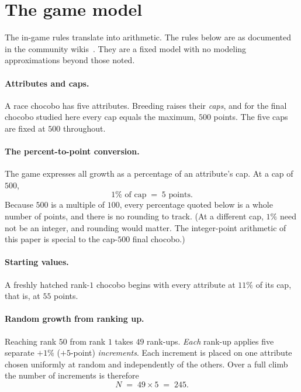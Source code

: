 \documentclass[11pt]{article}
\theoremstyle{remark}
\begin{document}
\section{The game model}\label{sec:model}

The in-game rules translate into arithmetic. The rules below are as documented
in the community wikis~\cite{cgw,wp-rankup,wp-final,wp-train,icy}. They are a fixed model with no
modeling approximations beyond those noted.

\paragraph{Attributes and caps.}
A race chocobo has five attributes. Breeding raises their \emph{caps}, and for the
final chocobo studied here every cap equals the maximum, $500$ points. The five caps
are fixed at $500$ throughout.

\paragraph{The percent-to-point conversion.}
The game expresses all growth as a percentage of an attribute's cap. At a cap of
$500$,
\[
   1\%\text{ of cap} \;=\; 5\text{ points.}
\]
Because $500$ is a multiple of $100$, every percentage quoted below is a whole
number of points, and there is no rounding to track. (At a different cap, $1\%$ need
not be an integer, and rounding would matter. The integer-point arithmetic of this
paper is special to the cap-$500$ final chocobo.)

\paragraph{Starting values.}
A freshly hatched rank-$1$ chocobo begins with every attribute at $11\%$ of its cap,
that is, at $55$ points.

\paragraph{Random growth from ranking up.}
Reaching rank $50$ from rank $1$ takes $49$ rank-ups. \emph{Each} rank-up applies
five separate $+1\%$ ($+5$-point) \emph{increments}. Each increment is placed on one
attribute chosen uniformly at random and independently of the others. Over a full
climb the number of increments is therefore
\[
   N \;=\; 49\times 5 \;=\; 245.
\]
\end{document}
